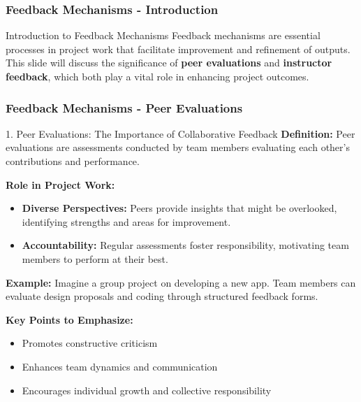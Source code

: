 \documentclass[aspectratio=169]{beamer}
\begin{document}
\begin{frame}[fragile]
    \frametitle{Feedback Mechanisms - Introduction}
    \begin{block}{Introduction to Feedback Mechanisms}
        Feedback mechanisms are essential processes in project work that facilitate improvement and refinement of outputs. This slide will discuss the significance of \textbf{peer evaluations} and \textbf{instructor feedback}, which both play a vital role in enhancing project outcomes.
    \end{block}
\end{frame}

\begin{frame}[fragile]
    \frametitle{Feedback Mechanisms - Peer Evaluations}
    \begin{block}{1. Peer Evaluations: The Importance of Collaborative Feedback}
        \textbf{Definition:} Peer evaluations are assessments conducted by team members evaluating each other's contributions and performance.

        \textbf{Role in Project Work:} 
        \begin{itemize}
            \item \textbf{Diverse Perspectives:} Peers provide insights that might be overlooked, identifying strengths and areas for improvement.
            \item \textbf{Accountability:} Regular assessments foster responsibility, motivating team members to perform at their best.
        \end{itemize}
        
        \textbf{Example:} Imagine a group project on developing a new app. Team members can evaluate design proposals and coding through structured feedback forms.
    \end{block}

    \textbf{Key Points to Emphasize:}
    \begin{itemize}
        \item Promotes constructive criticism
        \item Enhances team dynamics and communication
        \item Encourages individual growth and collective responsibility
    \end{itemize}
\end{frame}
\end{document}
